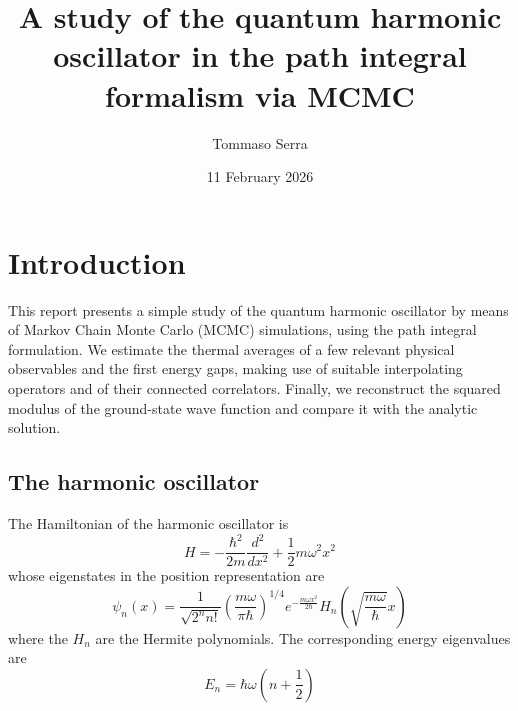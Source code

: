 \documentclass[10pt,a4paper]{article}
\title{\textbf{A study of the quantum harmonic oscillator in the path integral formalism via MCMC}}
\author{Tommaso Serra}
\date{11 February 2026}
\begin{document}
\maketitle

\section{Introduction}
This report presents a simple study of the quantum harmonic oscillator by means of
Markov Chain Monte Carlo (MCMC) simulations, using the path integral formulation.
We estimate the thermal averages of a few relevant physical observables and the
first energy gaps, making use of suitable interpolating operators and of their
connected correlators. Finally, we reconstruct the squared modulus of the
ground-state wave function and compare it with the analytic solution.

\subsection{The harmonic oscillator}
The Hamiltonian of the harmonic oscillator is
\begin{equation}
    H = -\frac{\hbar^2}{2m} \frac{d^2}{dx^2} + \frac{1}{2}m\omega^2x^2
\end{equation}
whose eigenstates in the position representation are
\begin{equation}
    \psi_n(x) = \frac{1}{\sqrt{2^n n!}} \left( \frac{m\omega}{\pi\hbar} \right)^{1/4} e^{-\frac{m\omega x^2}{2\hbar}} H_n\left( \sqrt{\frac{m\omega}{\hbar}} x \right)
\end{equation}
where the $H_n$ are the Hermite polynomials. The corresponding energy eigenvalues are
\begin{equation}
    E_n = \hbar\omega \left( n + \frac{1}{2} \right)
    \label{eq:energy_levels}
\end{equation}
\end{document}
